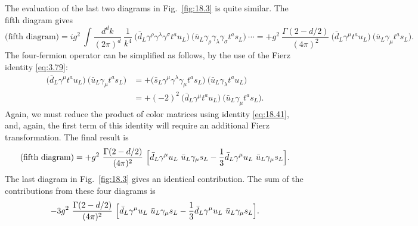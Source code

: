 The evaluation of the last two diagrams in Fig.~\ref{fig:18.3} is quite
similar.  The fifth diagram gives
\begin{equation}
  \text{(fifth diagram)} = ig^2\ \int \frac{d^dk}{(2\pi)^d}\ \frac{1}{k^4}\
    \bigl( \bar{d}_L\gamma^\rho\gamma^\lambda\gamma^\sigma t^a u_L \bigr)\
    \bigl( \bar{u}_L\gamma_\rho\gamma_\lambda\gamma_\sigma t^a s_L \bigr)\
    \cdots = +g^2\ \frac{\Gamma(2-d/2)}{(4\pi)^2}\ \bigl( \bar{d}_L\gamma^\mu
    t^a u_L \bigr)\ \bigl( \bar{u}_L\gamma_\mu t^a s_L \bigr) .
  \label{eq:18.45}
\end{equation}
The four-fermion operator can be simplified as follows, by the use of the
Fierz identity \eqref{eq:3.79}:
\begin{equation}
  \begin{aligned}
    \bigl( \bar{d}_L\gamma^\mu t^a u_L \bigr)\ \bigl( \bar{u}_L\gamma_\mu
      t^a s_L \bigr) &= +\bigl( \bar{s}_L\gamma^\mu\gamma^\lambda\gamma_\mu
      t^a s_L \bigr)\ \bigl( \bar{u}_L\gamma_\lambda t^a u_L \bigr)\\
    &= +(-2)^2\ \bigl( \bar{d}_L\gamma^\mu t^a u_L \bigr)\ \bigl(
      \bar{u}_L\gamma_\mu t^a s_L \bigr) .
  \end{aligned}
  \label{eq:18.46}
\end{equation}
Again, we must reduce the product of color matrices using identity
\eqref{eq:18.41}, and, again, the first term of this identity will require an
additional Fierz transformation.  The final result is
\begin{equation}
  \text{(fifth diagram)} = +g^2\ \frac{\Gamma(2-d/2)}{(4\pi)^2}\ \Bigl[
    \bar{d}_L\gamma^\mu u_L\ \bar{u}_L\gamma_\mu s_L
    - \frac{1}{3}\bar{d}_L\gamma^\mu u_L\ \bar{u}_L\gamma_\mu s_L
    \Bigr] .
  \label{eq:18.47}
\end{equation}
The last diagram in Fig.~\ref{fig:18.3} gives an identical contribution.
The sum of the contributions from these four diagrams is
\begin{equation}
  -3g^2\ \frac{\Gamma(2-d/2)}{(4\pi)^2}\ \Bigl[ \bar{d}_L\gamma^\mu u_L\
    \bar{u}_L\gamma_\mu s_L - \frac{1}{3}\bar{d}_L\gamma^\mu u_L\
      \bar{u}_L\gamma_\mu s_L \Bigr] .
  \label{eq:18.48}
\end{equation}

